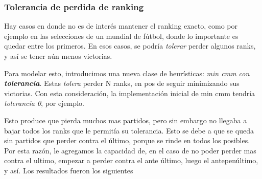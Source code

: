 \documentclass[a4paper]{article}
\begin{document}
\subsubsection{Tolerancia de perdida de ranking}

Hay casos en donde no es de interés mantener el ranking exacto, como por ejemplo en las selecciones de un mundial de fútbol, donde lo importante es quedar entre los primeros. En esos casos, se podría \textit{tolerar} perder algunos ranks, y así se tener aún menos victorias.

Para modelar esto, introducimos una nueva clase de heurísticas: \textit{min cmm con \textbf{tolerancia}}. Estas \textit{tolera} perder N ranks, en pos de seguir minimizando sus victorias. Con esta consideración, la implementación inicial de min cmm tendría \textit{tolerancia 0}, por ejemplo.

Esto produce que pierda muchos mas partidos, pero sin embargo no llegaba a bajar todos los ranks que le permitía su tolerancia. Esto se debe a que se queda sin partidos que perder contra el último, porque se rinde en todos los posibles. Por esta razón, le agregamos la capacidad de, en el caso de no poder perder mas contra el ultimo, empezar a perder contra el ante último, luego el antepenúltimo, y así. Los resultados fueron los siguientes
\end{document}
